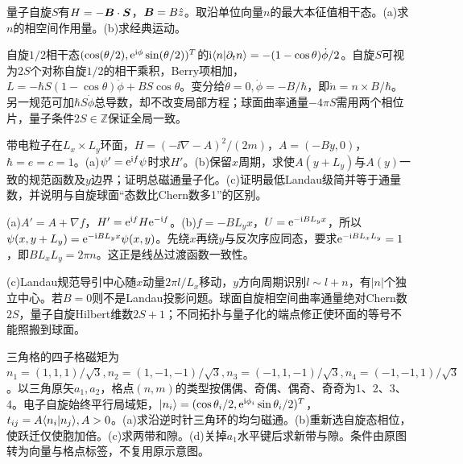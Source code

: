 \begin{exercise}[原题4(a)--(b)]
量子自旋$S$有$H=-\boldsymbol{B}\cdot\boldsymbol{S}$，$\boldsymbol{B}=B\hat z$。取沿单位向量$n$的最大本征值相干态。(a)求$n$的相空间作用量。(b)求经典运动。
\end{exercise}
\begin{solution}
自旋$1/2$相干态$(\cos(\theta/2),\mathrm e^{\mathrm i\phi}\sin(\theta/2))^T$的$\mathrm i\langle n|\partial_tn\rangle=-(1-\cos\theta)\dot\phi/2$。自旋$S$可视为$2S$个对称自旋$1/2$的相干乘积，Berry项相加，$L=-\hbar S(1-\cos\theta)\dot\phi+BS\cos\theta$。变分给$\dot\theta=0,\dot\phi=-B/\hbar$，即$\dot n=n\times B/\hbar$。另一规范可加$\hbar S\dot\phi$总导数，却不改变局部方程；球面曲率通量$-4\pi S$需用两个相位片，量子条件$2S\in\mathbb Z$保证全局一致。
\end{solution}
\begin{exercise}[原题1(a)--(c)]
带电粒子在$L_x\times L_y$环面，$H=(-\ii\nabla-A)^2/(2m)$，$A=(-By,0)$，$\hbar=e=c=1$。(a)$\psi'=\mathrm e^{\mathrm i f}\psi$时求$H'$。(b)保留$x$周期，求使$A(y+L_y)$与$A(y)$一致的规范函数及$y$边界；证明总磁通量子化。(c)证明最低Landau级简并等于通量数，并说明与自旋球面“态数比Chern数多1”的区别。
\end{exercise}
\begin{solution}
(a)$A'=A+\nabla f$，$H'=\mathrm e^{\mathrm i f}H\mathrm e^{-\mathrm i f}$。(b)$f=-BL_yx$，$U=\mathrm e^{-\mathrm i BL_yx}$，所以$\psi(x,y+L_y)=\mathrm e^{-\mathrm i BL_yx}\psi(x,y)$。先绕$x$再绕$y$与反次序应同态，要求$\mathrm e^{-\mathrm i BL_xL_y}=1$，即$BL_xL_y=2\pi n$。这正是线丛过渡函数一致性。

(c)Landau规范导引中心随$x$动量$2\pi l/L_x$移动，$y$方向周期识别$l\sim l+n$，有$|n|$个独立中心。若$B=0$则不是Landau投影问题。球面自旋相空间曲率通量绝对Chern数$2S$，量子自旋Hilbert维数$2S+1$；不同拓扑与量子化的端点修正使环面的等号不能照搬到球面。
\end{solution}
\begin{exercise}[原题2(a)--(d)]
三角格的四子格磁矩为$n_1=(1,1,1)/\sqrt3,n_2=(1,-1,-1)/\sqrt3,n_3=(-1,1,-1)/\sqrt3,n_4=(-1,-1,1)/\sqrt3$。以三角原矢$a_1,a_2$，格点$(n,m)$的类型按偶偶、奇偶、偶奇、奇奇为1、2、3、4。电子自旋始终平行局域矩，$\lvert n_i\rangle=(\cos\theta_i/2,\mathrm e^{\mathrm i\phi_i}\sin\theta_i/2)^T$，$t_{ij}=A\langle n_i|n_j\rangle,A>0$。(a)求沿逆时针三角环的均匀磁通。(b)重新选自旋态相位，使跃迁仅使胞加倍。(c)求两带和隙。(d)关掉$a_1$水平键后求新带与隙。条件由原图转为向量与格点标签，不复用原示意图。
\end{exercise}
